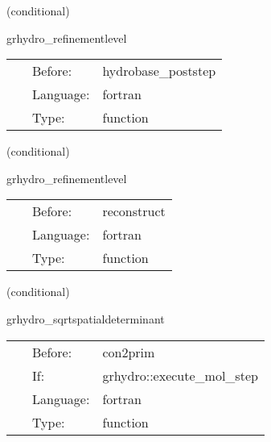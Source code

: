 \vspace{5mm}

   (conditional) 

\hspace{5mm} grhydro\_refinementlevel 

\hspace{5mm}{\it calculate current refinement level } 


\hspace{5mm}

 \begin{tabular*}{160mm}{cll} 
~ & Before:  & hydrobase\_poststep \\ 
~ & Language:  & fortran \\ 
~ & Type:  & function \\ 
\end{tabular*} 


\vspace{5mm}

   (conditional) 

\hspace{5mm} grhydro\_refinementlevel 

\hspace{5mm}{\it calculate current refinement level } 


\hspace{5mm}

 \begin{tabular*}{160mm}{cll} 
~ & Before:  & reconstruct \\ 
~ & Language:  & fortran \\ 
~ & Type:  & function \\ 
\end{tabular*} 


\vspace{5mm}

   (conditional) 

\hspace{5mm} grhydro\_sqrtspatialdeterminant 

\hspace{5mm}{\it calculate sdetg } 


\hspace{5mm}

 \begin{tabular*}{160mm}{cll} 
~ & Before:  & con2prim \\ 
~ & If:  & grhydro::execute\_mol\_step \\ 
~ & Language:  & fortran \\ 
~ & Type:  & function \\ 
\end{tabular*} 


